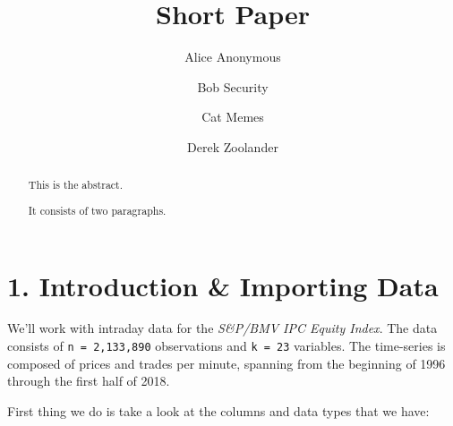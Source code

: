 \documentclass[]{elsarticle} %
\begin{document}
\begin{frontmatter}

  \title{Short Paper}
    \author[Some Institute of Technology]{Alice Anonymous}
    \author[Another University]{Bob Security}
    \author[Another University]{Cat Memes}
    \author[Some Institute of Technology]{Derek Zoolander}
      \address[Some Institute of Technology]{Department, Street, City, State, Zip}
    \address[Another University]{Department, Street, City, State, Zip}
  
  \begin{abstract}
  This is the abstract.
  
  It consists of two paragraphs.
  \end{abstract}
  
 \end{frontmatter}

\hypertarget{introduction-importing-data}{%
\section{1. Introduction \& Importing
Data}\label{introduction-importing-data}}

We'll work with intraday data for the \emph{S\&P/BMV IPC Equity Index}.
The data consists of \texttt{n\ =\ 2,133,890} observations and
\texttt{k\ =\ 23} variables. The time-series is composed of prices and
trades per minute, spanning from the beginning of 1996 through the first
half of 2018.

First thing we do is take a look at the columns and data types that we
have:
\end{document}

